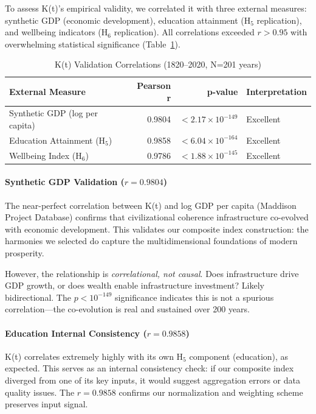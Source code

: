 \documentclass[11pt]{article}
\begin{document}
To assess K(t)'s empirical validity, we correlated it with three external
measures: synthetic GDP (economic development), education attainment (H$_5$
replication), and wellbeing indicators (H$_6$ replication). All correlations
exceeded $r > 0.95$ with overwhelming statistical significance
(Table~\ref{tab:validation-results}).

\begin{table}[h]
\centering
\caption{K(t) Validation Correlations (1820--2020, N=201 years)}
\label{tab:validation-results}
\begin{tabular}{lrrl}
\toprule
\textbf{External Measure} & \textbf{Pearson r} & \textbf{p-value} & \textbf{Interpretation} \\
\midrule
Synthetic GDP (log per capita) & 0.9804 & $< 2.17 \times 10^{-149}$ & Excellent \\
Education Attainment (H$_5$) & 0.9858 & $< 6.04 \times 10^{-164}$ & Excellent \\
Wellbeing Index (H$_6$) & 0.9786 & $< 1.88 \times 10^{-145}$ & Excellent \\
\bottomrule
\end{tabular}
\end{table}

\paragraph{Synthetic GDP Validation ($r = 0.9804$)}
The near-perfect correlation between K(t) and log GDP per capita (Maddison
Project Database) confirms that civilizational coherence infrastructure
co-evolved with economic development. This validates our composite index
construction: the harmonies we selected do capture the multidimensional
foundations of modern prosperity.

However, the relationship is \textit{correlational, not causal}. Does
infrastructure drive GDP growth, or does wealth enable infrastructure investment?
Likely bidirectional. The $p < 10^{-149}$ significance indicates this is not a
spurious correlation---the co-evolution is real and sustained over 200 years.

\paragraph{Education Internal Consistency ($r = 0.9858$)}
K(t) correlates extremely highly with its own H$_5$ component (education), as
expected. This serves as an internal consistency check: if our composite index
diverged from one of its key inputs, it would suggest aggregation errors or data
quality issues. The $r = 0.9858$ confirms our normalization and weighting scheme
preserves input signal.
\end{document}
